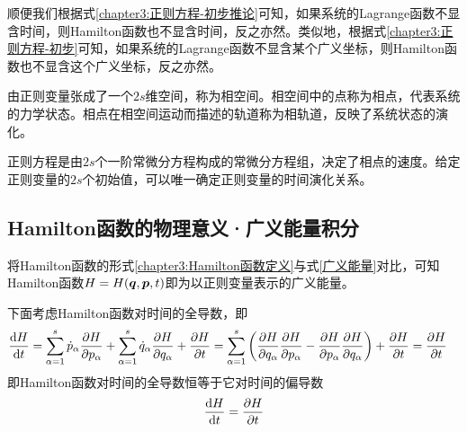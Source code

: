 顺便我们根据式\eqref{chapter3:正则方程-初步推论}可知，如果系统的Lagrange函数不显含时间，则Hamilton函数也不显含时间，反之亦然。类似地，根据式\eqref{chapter3:正则方程-初步}可知，如果系统的Lagrange函数不显含某个广义坐标，则Hamilton函数也不显含这个广义坐标，反之亦然。

由正则变量张成了一个$2s$维空间，称为{\heiti 相空间}。相空间中的点称为{\heiti 相点}，代表系统的力学状态。相点在相空间运动而描述的轨道称为{\heiti 相轨道}，反映了系统状态的演化。

正则方程是由$2s$个一阶常微分方程构成的常微分方程组，决定了相点的速度。给定正则变量的$2s$个初始值，可以唯一确定正则变量的时间演化关系。




\subsection{Hamilton函数的物理意义·广义能量积分}

将Hamilton函数的形式\eqref{chapter3:Hamilton函数定义}与式\eqref{广义能量}对比，可知Hamilton函数$H = H(\boldsymbol{q},\boldsymbol{p},t)$即为以正则变量表示的广义能量。

下面考虑Hamilton函数对时间的全导数，即
\begin{align*}
	\frac{\mathrm{d} H}{\mathrm{d} t} & = \sum_{\alpha=1}^s \dot{p}_\alpha\frac{\partial H}{\partial p_\alpha} + \sum_{\alpha=1}^s \dot{q}_\alpha\frac{\partial H}{\partial q_\alpha} + \frac{\partial H}{\partial t} = \sum_{\alpha=1}^s \left(\frac{\partial H}{\partial q_\alpha}\frac{\partial H}{\partial p_\alpha} - \frac{\partial H}{\partial p_\alpha}\frac{\partial H}{\partial q_\alpha}\right) + \frac{\partial H}{\partial t} = \frac{\partial H}{\partial t}
\end{align*}
即Hamilton函数对时间的全导数恒等于它对时间的偏导数
\begin{equation}
	\frac{\mathrm{d} H}{\mathrm{d} t} = \frac{\partial H}{\partial t}
\end{equation}

